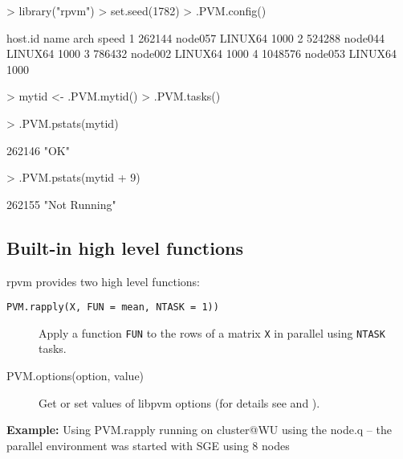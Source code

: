 \begin{Schunk}
\begin{Sinput}
> library("rpvm")
> set.seed(1782)
> .PVM.config()
\end{Sinput}
\begin{Soutput}
  host.id    name    arch speed
1  262144 node057 LINUX64  1000
2  524288 node044 LINUX64  1000
3  786432 node002 LINUX64  1000
4 1048576 node053 LINUX64  1000
\end{Soutput}
\begin{Sinput}
> mytid <- .PVM.mytid()
> .PVM.tasks()
\end{Sinput}
\begin{Sinput}
> .PVM.pstats(mytid)
\end{Sinput}
\begin{Soutput}
262146 
  "OK" 
\end{Soutput}
\begin{Sinput}
> .PVM.pstats(mytid + 9)
\end{Sinput}
\begin{Soutput}
       262155 
"Not Running" 
\end{Soutput}
\end{Schunk}


\subsection{Built-in high level functions}

rpvm provides two high level functions: 

\begin{description}
\item[\texttt{PVM.rapply(X, FUN = mean, NTASK = 1))}] Apply a function
  \texttt{FUN} to the rows of a matrix \texttt{X} in
  parallel using \texttt{NTASK} tasks.
\item[PVM.options(option, value)] Get or set values of libpvm options
  (for details see \cite{nali07rpvm} and \cite{geist94pvm}).
\end{description}


\textbf{Example:} Using PVM.rapply\newline
running on cluster@WU using the node.q -- the parallel environment was
started with SGE using 8 nodes

